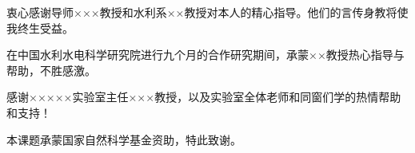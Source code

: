 
\begin{acknowledgements}
  衷心感谢导师×××教授和水利系××教授对本人的精心指导。他们的言传身教将使我终生受益。

  在中国水利水电科学研究院进行九个月的合作研究期间，承蒙××教授热心指导与帮助，不胜感激。

  感谢×××××实验室主任×××教授，以及实验室全体老师和同窗们学的热情帮助和支持！

  本课题承蒙国家自然科学基金资助，特此致谢。
\end{acknowledgements}
